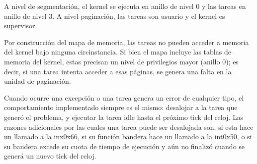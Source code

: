 	A nivel de segmentación, el kernel se ejecuta en anillo de nivel 0 y las tareas 
en anillo de nivel 3. A nivel paginación, las tareas son usuario y el kernel es supervisor.

	Por construcción del mapa de memoria, las tareas no pueden acceder a memoria del 
kernel bajo ninguna circinstancia. Si bien el mapa incluye las tablas de memoria
del kernel, estas precisan un nivel de privilegios mayor (anillo 0); es decir, si una tarea intenta
acceder a esas páginas, se genera una falta en la unidad de paginación.

	Cuando ocurre una excepción o una tarea genera un error de cualquier tipo, el comportamiento 
implementado siempre es el mismo: desalojar a la tarea que generó el problema, y ejecutar la tarea 
idle hasta el próximo tick del reloj. Las razones adicionales por las cuales una tarea puede ser 
desalojada son: si esta hace un llamado a la inx0x66, si su función bandera hace un llamado a la int0x50, 
o si su bandera excede su cuota de tiempo de ejecución y aún no finalizó cuando se generá un nuevo tick del reloj.